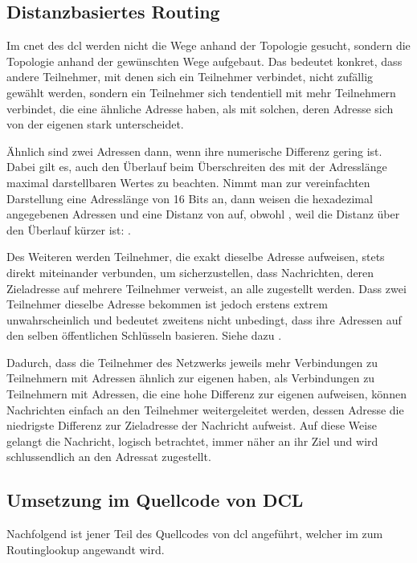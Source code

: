 \subsection{Distanzbasiertes Routing}
Im \gls{cnet} des \gls{dcl} werden nicht die Wege anhand der Topologie gesucht, sondern die
Topologie anhand der gewünschten Wege aufgebaut. Das bedeutet konkret, dass andere Teilnehmer, mit
denen sich ein Teilnehmer verbindet, nicht zufällig gewählt werden, sondern ein Teilnehmer sich
tendentiell mit mehr Teilnehmern verbindet, die eine ähnliche Adresse haben, als mit solchen,
deren Adresse sich von der eigenen stark unterscheidet.

Ähnlich sind zwei Adressen dann, wenn ihre numerische Differenz gering ist. Dabei gilt es, auch
den Überlauf beim Überschreiten des mit der Adresslänge maximal darstellbaren Wertes zu beachten.
Nimmt man zur vereinfachten Darstellung eine Adresslänge von 16 Bits an, dann weisen die
hexadezimal angegebenen Adressen  und  eine Distanz von  auf,
obwohl , weil die Distanz über den Überlauf kürzer ist:
.

Des Weiteren werden Teilnehmer, die exakt dieselbe Adresse aufweisen, stets direkt miteinander
verbunden, um sicherzustellen, dass Nachrichten, deren Zieladresse auf mehrere Teilnehmer verweist,
an alle zugestellt werden. Dass zwei Teilnehmer dieselbe Adresse bekommen ist jedoch erstens
extrem unwahrscheinlich und bedeutet zweitens nicht unbedingt, dass ihre Adressen auf den selben
öffentlichen Schlüsseln basieren. Siehe dazu .

Dadurch, dass die Teilnehmer des Netzwerks jeweils mehr Verbindungen zu Teilnehmern mit Adressen
ähnlich zur eigenen haben, als Verbindungen zu Teilnehmern mit Adressen, die eine hohe Differenz
zur eigenen aufweisen, können Nachrichten einfach an den Teilnehmer weitergeleitet werden, dessen
Adresse die niedrigste Differenz zur Zieladresse der Nachricht aufweist. Auf diese Weise gelangt
die Nachricht, logisch betrachtet, immer näher an ihr Ziel und wird schlussendlich an den Adressat
zugestellt.

\subsection{Umsetzung im Quellcode von DCL}
Nachfolgend ist jener Teil des Quellcodes von \gls{dcl} angeführt, welcher im 
zum Routinglookup angewandt wird.

